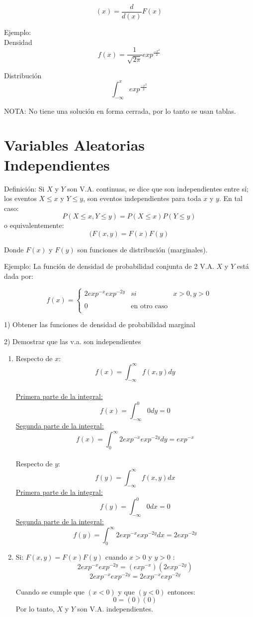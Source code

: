 \documentclass[11pt,fleqn]{book} %
\numberwithin{equation}{section} %
\numberwithin{figure}{section} %
\numberwithin{table}{section} %
\begin{document}
$$(x) = \frac{d}{d(x)} F(x)$$

Ejemplo:
\ \\%
Densidad $$f(x) = \frac{1}{\sqrt{2\pi}} exp^{{\frac{-x^2}{2}}}$$

Distribución $$\int_{-\infty}^{x} exp^{{\frac{-x^2}{2}}} $$

NOTA: No tiene una solución en forma cerrada, por lo tanto se usan tablas.
\section{Variables Aleatorias Independientes}
Definición: Si $X$ y $Y$ son V.A. continuas, se dice que son independientes entre sí; los eventos $X \leq x$ y $Y \leq y $, son eventos independientes para toda $x$ y $ y $. En tal caso:
$$P ( X \leq x, Y \leq y ) = P ( X \leq x) P (Y \leq y )$$
o equivalentemente:
$$(F(x, y) = F(x) F(y)$$

Donde $F(x)$ y $F(y)$ son funciones de distribución (marginales).

Ejemplo: La función de densidad de probabilidad conjunta de 2 V.A. $X$ y $Y$ está dada por:


$$f(x)= \left\{ \begin{array}{lcc}
             2 exp^{-x} exp^{-2y} &   si  &  x > 0, y > 0 \\
             \\ 0 &  \text{en otro caso} \\
               \end{array}
   \right.$$

1) Obtener las funciones de densidad de probabilidad marginal

2) Demostrar que las v.a. son independientes

\begin{enumerate}
\item Respecto de $x$:
        $$f(x) = \int_{-\infty}^{\infty} f(x, y) dy$$
        \ \\%
        \underline{Primera parte de la integral:}
        $$f(x) = \int_{-\infty}^{0}  0 dy = 0$$
        \underline{Segunda parte de la integral:}
        $$f(x) = \int_{0}^{\infty}  2 exp^{-x} exp^{-2y} dy = exp^{-x}$$
        \ \\%
        Respecto de $y$:
        $$f(y) = \int_{-\infty}^{\infty} f(x, y) dx$$
        \underline{Primera parte de la integral:}
        $$f(y) = \int_{-\infty}^{0}  0 dx = 0$$
        \underline{Segunda parte de la integral:}
        $$f(y) = \int_{0}^{\infty}  2 exp^{-x} exp^{-2y} dx = 2exp^{-2y}$$
\item Si: $F(x, y) = F(x) F(y)$ cuando $x > 0$ y $y
> 0$ :
        $$2exp^{-x} exp^{-2y} = (exp^{-x}) (2exp^{-2y})$$
        $$ 2 exp^{-x} exp^{-2y} = 2exp^{-x}exp^{-2y}  $$
        
        Cuando se cumple que $( x< 0 )$ y que $( y< 0)$ entonces:
        $$  0 = (0)(0) $$
        Por lo tanto, $X$ y $Y$ son V.A. independientes.
\end{enumerate}
\end{document}
